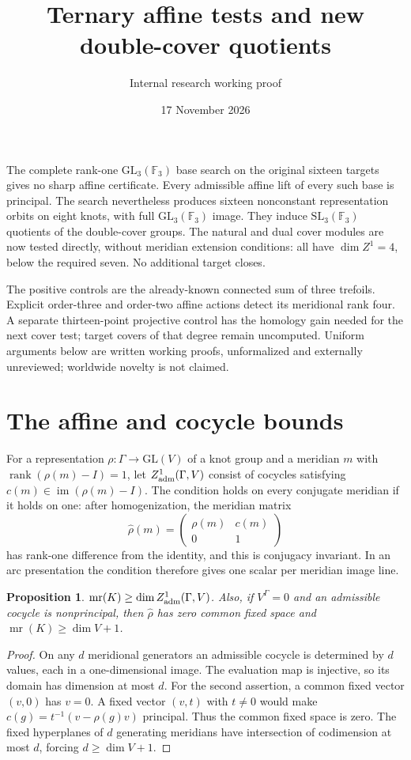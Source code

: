 \documentclass[11pt]{article}
\title{Ternary affine tests and new double-cover quotients}
\author{Internal research working proof}
\date{17 November 2026}
\newtheorem{proposition}{Proposition}
\newcommand{\mr}{\operatorname{mr}}
\newcommand{\rank}{\operatorname{rank}}
\newcommand{\F}{\mathbb F}
\begin{document}
\maketitle

The complete rank-one $\mathrm{GL}_3(\F_3)$ base search on
the original sixteen targets gives no sharp affine certificate.
Every admissible affine lift of every such base is principal.
The search nevertheless produces sixteen nonconstant
representation orbits on eight knots, with full
$\mathrm{GL}_3(\F_3)$ image. They induce
$\mathrm{SL}_3(\F_3)$ quotients of the double-cover groups.
The natural and dual cover modules are now tested directly,
without meridian extension conditions: all have $\dim Z^1=4$,
below the required seven. No additional target closes.

The positive controls are the already-known connected sum of
three trefoils. Explicit order-three and order-two affine
actions detect its meridional rank four. A separate
thirteen-point projective control has the homology gain needed
for the next cover test; target covers of that degree remain
uncomputed. Uniform arguments below are written working
proofs, unformalized and externally unreviewed; worldwide
novelty is not claimed.

\section{The affine and cocycle bounds}

For a representation $\rho:\Gamma\to\mathrm{GL}(V)$ of a knot
group and a meridian $m$ with $\rank(\rho(m)-I)=1$, let
$Z^1_{\rm adm}(\Gamma,V)$ consist of cocycles satisfying
$c(m)\in\operatorname{im}(\rho(m)-I)$. The condition holds on
every conjugate meridian if it holds on one: after
homogenization, the meridian matrix
\[
 \widehat\rho(m)=\begin{pmatrix}\rho(m)&c(m)\\0&1\end{pmatrix}
\]
has rank-one difference from the identity, and this is
conjugacy invariant. In an arc presentation the condition
therefore gives one scalar per meridian image line.

\begin{proposition}
$\mr(K)\ge\dim Z^1_{\rm adm}(\Gamma,V)$. Also, if
$V^\Gamma=0$ and an admissible cocycle is nonprincipal, then
$\widehat\rho$ has zero common fixed space and
$\mr(K)\ge\dim V+1$.
\end{proposition}
\begin{proof}
On any $d$ meridional generators an admissible cocycle is
determined by $d$ values, each in a one-dimensional image.
The evaluation map is injective, so its domain has dimension
at most $d$. For the second assertion, a common fixed vector
$(v,0)$ has $v=0$. A fixed vector $(v,t)$ with $t\ne0$ would
make $c(g)=t^{-1}(v-\rho(g)v)$ principal. Thus the common fixed
space is zero. The fixed hyperplanes of $d$ generating
meridians have intersection of codimension at most $d$,
forcing $d\ge\dim V+1$.
\end{proof}
\end{document}
